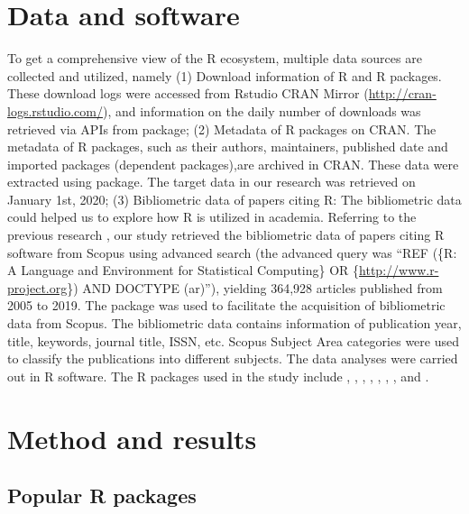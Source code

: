 \hypertarget{data-and-software}{%
\section{Data and software}\label{data-and-software}}

To get a comprehensive view of the R ecosystem, multiple data sources
are collected and utilized, namely (1) Download information of R and R
packages. These download logs were accessed from Rstudio CRAN Mirror
(\url{http://cran-logs.rstudio.com/}), and information on the daily
number of downloads was retrieved via APIs from 
package; (2) Metadata of R packages on CRAN. The metadata of R packages,
such as their authors, maintainers, published date and imported packages
(dependent packages),are archived in CRAN. These data were extracted
using  package. The target data in our research was
retrieved on January 1st, 2020; (3) Bibliometric data of papers citing
R: The bibliometric data could helped us to explore how R is utilized in
academia. Referring to the previous research \citep{LiYan-559}, our
study retrieved the bibliometric data of papers citing R software from
Scopus using advanced search (the advanced query was ``REF (\{R: A
Language and Environment for Statistical Computing\} OR
\{\url{http://www.r-project.org}\}) AND DOCTYPE (ar)''), yielding
364,928 articles published from 2005 to 2019. The 
package was used to facilitate the acquisition of bibliometric data from
Scopus. The bibliometric data contains information of publication year,
title, keywords, journal title, ISSN, etc. Scopus Subject Area
categories were used to classify the publications into different
subjects. The data analyses were carried out in R software. The R
packages used in the study include ,
, , ,
, , ,
 and .

\hypertarget{method-and-results}{%
\section{Method and results}\label{method-and-results}}

\hypertarget{popular-r-packages}{%
\subsection{Popular R packages}\label{popular-r-packages}}

